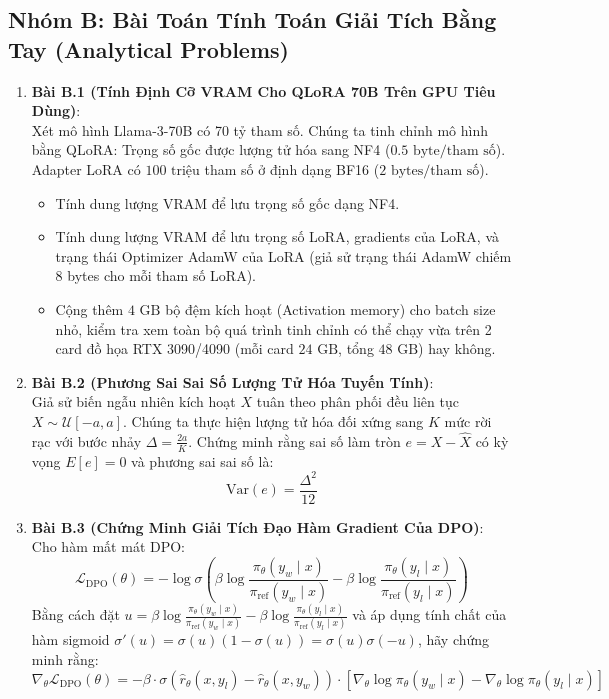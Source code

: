 \subsection{Nhóm B: Bài Toán Tính Toán Giải Tích Bằng Tay (Analytical Problems)}
\begin{enumerate}
  \item \textbf{Bài B.1 (Tính Định Cỡ VRAM Cho QLoRA 70B Trên GPU Tiêu Dùng)}: \\
  Xét mô hình Llama-3-70B có 70 tỷ tham số.
  Chúng ta tinh chỉnh mô hình bằng QLoRA:
  Trọng số gốc được lượng tử hóa sang NF4 ($0.5\text{ byte/tham số}$).
  Adapter LoRA có $100\text{ triệu}$ tham số ở định dạng BF16 ($2\text{ bytes/tham số}$).
  \begin{itemize}
    \item[a)] Tính dung lượng VRAM để lưu trọng số gốc dạng NF4.
    \item[b)] Tính dung lượng VRAM để lưu trọng số LoRA, gradients của LoRA, và trạng thái Optimizer AdamW của LoRA (giả sử trạng thái AdamW chiếm 8 bytes cho mỗi tham số LoRA).
    \item[c)] Cộng thêm $4\text{ GB}$ bộ đệm kích hoạt (Activation memory) cho batch size nhỏ, kiểm tra xem toàn bộ quá trình tinh chỉnh có thể chạy vừa trên 2 card đồ họa RTX 3090/4090 (mỗi card $24\text{ GB}$, tổng $48\text{ GB}$) hay không.
  \end{itemize}

  \item \textbf{Bài B.2 (Phương Sai Sai Số Lượng Tử Hóa Tuyến Tính)}: \\
  Giả sử biến ngẫu nhiên kích hoạt $X$ tuân theo phân phối đều liên tục $X \sim \mathcal{U}[-a, a]$.
  Chúng ta thực hiện lượng tử hóa đối xứng sang $K$ mức rời rạc với bước nhảy $\Delta = \frac{2a}{K}$.
  Chứng minh rằng sai số làm tròn $e = X - \hat{X}$ có kỳ vọng $E[e] = 0$ và phương sai sai số là:
  \begin{equation*}
  \text{Var}(e) = \frac{\Delta^2}{12}
  \end{equation*}

  \item \textbf{Bài B.3 (Chứng Minh Giải Tích Đạo Hàm Gradient Của DPO)}: \\
  Cho hàm mất mát DPO:
  \begin{equation*}
  \mathcal{L}_{\text{DPO}}(\theta) = -\log \sigma\left( \beta \log \frac{\pi_\theta(y_w \mid x)}{\pi_{\text{ref}}(y_w \mid x)} - \beta \log \frac{\pi_\theta(y_l \mid x)}{\pi_{\text{ref}}(y_l \mid x)} \right)
  \end{equation*}
  Bằng cách đặt $u = \beta \log \frac{\pi_\theta(y_w \mid x)}{\pi_{\text{ref}}(y_w \mid x)} - \beta \log \frac{\pi_\theta(y_l \mid x)}{\pi_{\text{ref}}(y_l \mid x)}$ và áp dụng tính chất của hàm sigmoid $\sigma'(u) = \sigma(u)(1 - \sigma(u)) = \sigma(u)\sigma(-u)$, hãy chứng minh rằng:
  \begin{equation*}
  \nabla_\theta \mathcal{L}_{\text{DPO}}(\theta) = -\beta \cdot \sigma\left( \hat{r}_\theta(x, y_l) - \hat{r}_\theta(x, y_w) \right) \cdot \left[ \nabla_\theta \log \pi_\theta(y_w \mid x) - \nabla_\theta \log \pi_\theta(y_l \mid x) \right]
  \end{equation*}


\end{enumerate}
